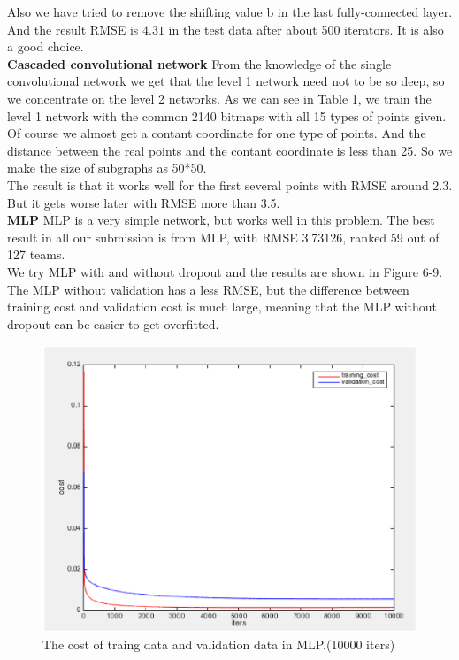 \documentclass[10pt,twocolumn,letterpaper]{article}
\begin{document}
Also we have tried to remove the shifting value b in the last fully-connected layer. And the result RMSE is $4.31$ in the test data after about 500 iterators. It is also a good choice. \\

\textbf{Cascaded convolutional network} From the knowledge of the single convolutional network we get that the level 1 network need not to be so deep, so we concentrate on the level 2 networks. As we can see in Table 1, we train the level 1 network with the common 2140 bitmaps with all 15 types of points given. Of course we almost get a contant coordinate for one type of points. And the distance between the real points and the contant coordinate is less than 25. So we make the size of subgraphs as 50*50. \\

The result is that it works well for the first several points with RMSE around 2.3. But it gets worse later with RMSE more than 3.5. \\

\textbf{MLP} MLP is a very simple network, but works well in this problem. The best result in all our submission is from MLP, with RMSE 3.73126, ranked 59 out of 127 teams. \\
We try MLP with and without dropout and the results are shown in Figure 6-9. The MLP without validation has a less RMSE, but the difference between training cost and validation cost is much large, meaning that the MLP without dropout can be easier to get overfitted.\\

\begin{figure}[htbp]
\centering
\includegraphics[width=0.8\linewidth]{MLP_cost.eps}
\caption{The cost of traing data and validation data in MLP.(10000 iters)}
\label{fig:long}
\label{fig:onecol}
\end{figure}
\end{document}
